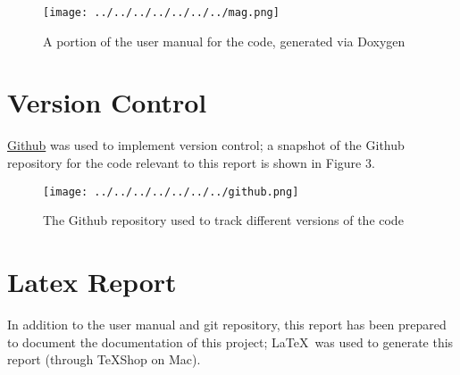 \documentclass[11pt]{article}
\begin{document}
\begin{figure}[h]
\centering
\texttt{[image: ../../../../../../../mag.png]}
\caption{A portion of the user manual for the code, generated via Doxygen}
\end{figure}

\section{Version Control}
\href{https://github.com/Parham2000/ASTE-404-Test.git}{Github} was used to implement version control; a snapshot of the Github repository for the code relevant to this report is shown in Figure 3.

\begin{figure}[h]
\centering
\texttt{[image: ../../../../../../../github.png]}
\caption{The Github repository used to track different versions of the code}
\end{figure}

\section{Latex Report}
In addition to the user manual and git repository, this report has been prepared to document the documentation of this project; \LaTeX\ was used to generate this report (through TeXShop on Mac).
\end{document}
